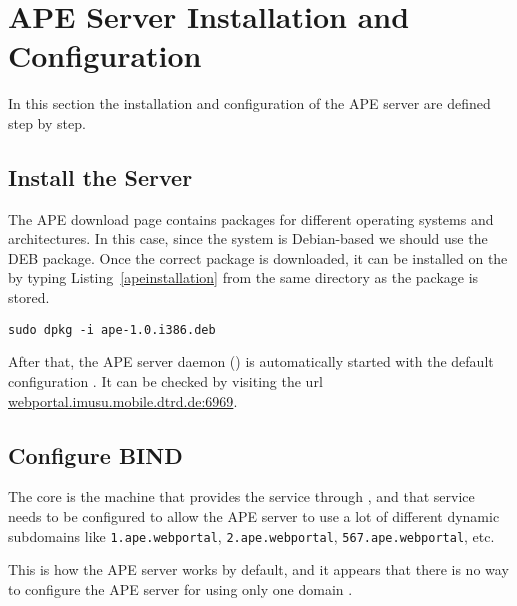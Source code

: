 \section{APE Server Installation and Configuration} %
\label{sec:apeconfig}

In this section the installation and configuration of the \ac{APE} server are defined step by step.

\subsection{Install the Server} %
\label{sub:apeinstall}

The \ac{APE} download page \cite{ApeDownload} contains packages for different operating systems and architectures.
In this case, since the system is Debian-based we should use the DEB package.
Once the correct package is downloaded, it can be installed on the  by typing Listing~\vref{apeinstallation} from the same directory as the package is stored.

\begin{lstlisting}[label=apeinstallation,caption=APE installation command]
sudo dpkg -i ape-1.0.i386.deb
\end{lstlisting}

After that, the \ac{APE} server daemon () is automatically started with the default configuration \cite{ApeSetup}.
It can be checked by visiting the url \url{webportal.imusu.mobile.dtrd.de:6969}.

\nicesubsectionending


\subsection{Configure BIND} %
\label{sub:bind}

The  core is the machine that provides the  service through , and that service needs to be configured to allow the \ac{APE} server to use a lot of different dynamic subdomains like \verb|1.ape.webportal|, \verb|2.ape.webportal|, \verb|567.ape.webportal|, etc.

This is how the \ac{APE} server works by default, and it appears that there is no way to configure the \ac{APE} server for using only one domain \cite{ApeConfig}.

